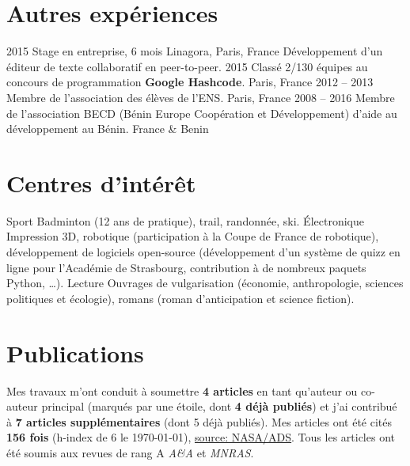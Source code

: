 \documentclass[french]{cv-style}
\renewcommand{\hl}[1]{\textbf{\color{darkred}#1}}
\begin{document}
%
%
%
\section{Autres expériences}

\begin{entrylist}
%
\entrynohl
{2015}
{Stage en entreprise, 6 mois}
{Linagora, Paris, France}
{Développement d'un éditeur de texte collaboratif en peer-to-peer.}
%
\entryshortnohl
{2015}
{Classé 2/130 équipes au concours de programmation \hl{Google Hashcode}.}
{Paris, France}
%
\entryshortnohl
{2012 -- 2013}
{Membre de l'association des élèves de l'ENS.}
{Paris, France}
%
\entryshortnohl
{2008 -- 2016}
{Membre de l'association BECD (Bénin Europe Coopération et Développement) d'aide au développement au Bénin.}
{France \& Benin}
\end{entrylist}

\section{Centres d'intérêt}
\begin{entrylist}
  \entryshortnohl
  {Sport}
  {
    Badminton (12 ans de pratique), trail, randonnée, ski.
  }
  {}
  \entryshortnohl
  {Électronique}
  {
    Impression 3D, robotique (participation à la Coupe de France de robotique), développement de logiciels open-source (développement d'un système de quizz en ligne pour l'Académie de Strasbourg, contribution à de nombreux paquets Python, \dots).
  }
  {}
  \entryshortnohl
  {Lecture}
  {Ouvrages de vulgarisation (économie, anthropologie, sciences politiques et écologie), romans (roman d'anticipation et science fiction).}
  {}
\end{entrylist}

\newpage

%


\section{Publications}
Mes travaux m'ont conduit à soumettre \hl{4 articles} en tant qu'auteur ou co-auteur principal (marqués par une étoile, dont \hl{4 déjà publiés}) et j'ai contribué à \hl{7 articles supplémentaires} (dont 5 déjà publiés).
Mes articles ont été cités \hl{156 fois} (h-index de 6 le \today), \href{https://ui.adsabs.harvard.edu/search/filter_database_fq_database=AND&filter_database_fq_database=database%3A%22astronomy%22&fq=%7B!type%3Daqp%20v%3D%24fq_database%7D&fq_database=(database%3A%22astronomy%22)&p_=0&q=((author%3A%22Cadiou%2C%20C%22))&sort=date%20desc%2C%20bibcode%20desc}{\setul{1pt}{.4pt}%
%
\ul{source: NASA/ADS}}.
Tous les articles ont été soumis aux revues de rang A \emph{A\&A} et \emph{MNRAS}.
\end{document}
